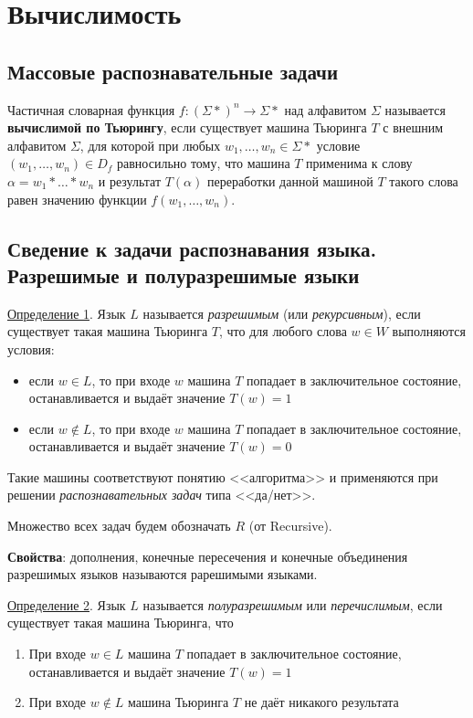 \section{Вычислимость}
\subsection{Массовые распознавательные задачи}
\dftion Частичная словарная функция $f:(\Sigma*)^n \to \Sigma*$ над алфавитом $\Sigma$ называется \textbf{вычислимой по Тьюрингу}, если существует машина Тьюринга $T$ с внешним алфавитом $\Sigma$, для которой при любых $w_1, \dots, w_n \in \Sigma*$ условие $(w_1, \dots, w_n) \in D_f$ равносильно тому, что машина $T$ применима к слову $\alpha = w_1 * \dots * w_n$ и результат $T(\alpha)$ переработки данной машиной $T$ такого слова равен значению функции $f(w_1,\dots,w_n)$.

\subsection{Сведение к задачи распознавания языка. Разрешимые и полуразрешимые языки}
\underline{Определение 1}. Язык $L$ называется \textit{разрешимым} (или \textit{рекурсивным}), если существует такая машина Тьюринга $T$, что для любого слова $w \in W$ выполняются условия:
\begin{itemize}
    \item если $w \in L$, то при входе $w$ машина $T$ попадает в заключительное состояние, останавливается и выдаёт значение $T(w) = 1$
    \item если $w \not \in L$, то при входе $w$ машина $T$ попадает в заключительное состояние, останавливается и выдаёт значение $T(w) = 0$
\end{itemize}

Такие машины соответствуют понятию <<алгоритма>> и применяются при решении \textit{распознавательных задач} типа <<да/нет>>.

Множество всех задач будем обозначать $R$ (от Recursive).

\textbf{Свойства}: дополнения, конечные пересечения и конечные объединения разрешимых языков называются рарешимыми языками.

\underline{Определение 2}. Язык $L$ называется \textit{полуразрешимым} или \textit{перечислимым}, если существует такая машина Тьюринга, что

\begin{enumerate}
    \item При входе $w \in L$ машина $T$ попадает в заключительное состояние, останавливается и выдаёт значение $T(w) = 1$
    \item При входе $w \not\in L$ машина Тьюринга $T$ не даёт никакого результата
\end{enumerate}


